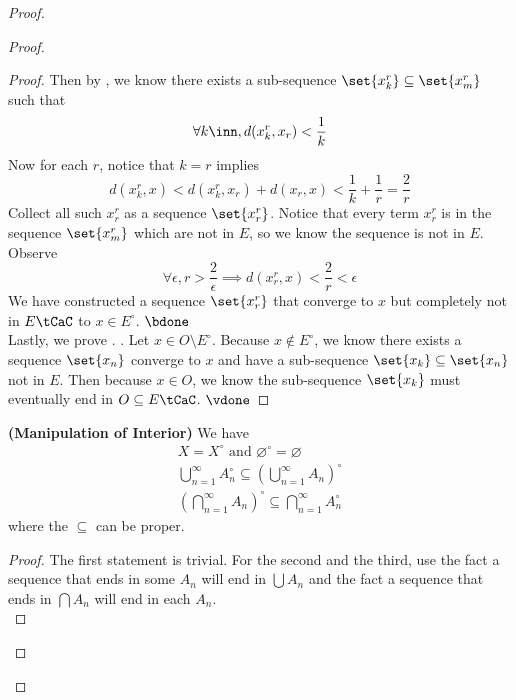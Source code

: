 \documentclass{report}
\begin{document}
\begin{proof}
\begin{proof}
\begin{proof}
Then by , we know there exists a sub-sequence $\set{x^r_k}\subseteq \set{x^r_m}$ such that
\begin{equation}
\forall k\inn, d(x^r_k,x_r)<\frac{1}{k}
\end{equation}
Now for each $r$, notice that  $k=r$ implies
\begin{equation}
d(x_k^r,x)<d(x^r_k,x_r)+d(x_r,x)<\frac{1}{k}+\frac{1}{r}=\frac{2}{r}
\end{equation}
Collect all such $x_r^r$ as a sequence  $\set{x_r^r}$. Notice that every term $x_r^r$ is in the sequence $\set{x_m^r}$ which are not in $E$, so we know the sequence is not in $E$. Observe
 \begin{equation}
\forall \epsilon, r>\frac{2}{\epsilon }\implies d(x_r^r,x)<\frac{2}{r}<\epsilon 
\end{equation}
We have constructed a sequence $\set{x_r^r}$ that converge to $x$ but completely not in  $E\tCaC$ to $x\in E^\circ $. $\bdone$\\

Lastly, we prove . . Let $x\in O\setminus E^\circ $. Because $x\not\in E^\circ $, we know there exists a sequence $\set{x_n}$ converge to $x$ and have a sub-sequence  $\set{x_k}\subseteq \set{x_n}$ not in $E$. Then because $x\in O$, we know the sub-sequence $\set{x_k}$ must eventually end in $O\subseteq E\tCaC$. $\vdone$
\end{proof}
\begin{theorem}
\label{3.3.3}
\textbf{(Manipulation of Interior)} We have
\begin{gather}
X=X^\circ\text{ and }\varnothing^\circ =\varnothing\\
\bigcup_{n=1}^\infty A_n^\circ \subseteq (\bigcup_{n=1}^\infty A_n)^\circ\\
(\bigcap _{n=1}^\infty A_n)^\circ \subseteq \bigcap _{n=1}^\infty A_n^\circ 
\end{gather}
where the $\subseteq$ can be proper.
\end{theorem}
\begin{proof}
The first statement is trivial. For the second and the third, use the fact a sequence that ends in  some $A_n$ will end in  $\bigcup A_n$ and the fact a sequence that ends in $\bigcap A_n$ will end in each $A_n$.\\


\end{proof}
\end{proof}
\end{proof}
\end{document}

